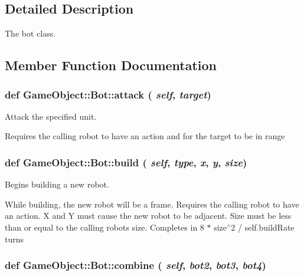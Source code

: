 \subsection{Detailed Description}
The bot class. 

\subsection{Member Function Documentation}
\hypertarget{classGameObject_1_1Bot_a20ce42e67cc1586a7086b708c56b6609}{
\subsubsection[{attack}]{\setlength{\rightskip}{0pt plus 5cm}def GameObject::Bot::attack ( {\em self}, \/   {\em target})}}
\label{classGameObject_1_1Bot_a20ce42e67cc1586a7086b708c56b6609}


Attack the specified unit. 

Requires the calling robot to have an action and for the target to be in range \hypertarget{classGameObject_1_1Bot_acb307f9ba536de899c113047d2599d05}{
\subsubsection[{build}]{\setlength{\rightskip}{0pt plus 5cm}def GameObject::Bot::build ( {\em self}, \/   {\em type}, \/   {\em x}, \/   {\em y}, \/   {\em size})}}
\label{classGameObject_1_1Bot_acb307f9ba536de899c113047d2599d05}


Begins building a new robot. 

While building, the new robot will be a frame. Requires the calling robot to have an action. X and Y must cause the new robot to be adjacent. Size must be less than or equal to the calling robots size. Completes in 8 $\ast$ size$^\wedge$2 / self.buildRate turns \hypertarget{classGameObject_1_1Bot_a86ef5a544c38e3bcbfc961ab5d4ff58f}{
\subsubsection[{combine}]{\setlength{\rightskip}{0pt plus 5cm}def GameObject::Bot::combine ( {\em self}, \/   {\em bot2}, \/   {\em bot3}, \/   {\em bot4})}}
\label{classGameObject_1_1Bot_a86ef5a544c38e3bcbfc961ab5d4ff58f}


